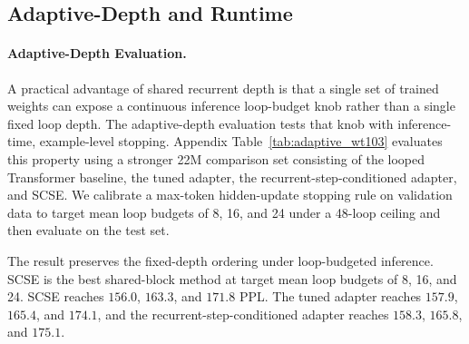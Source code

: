 \documentclass[letterpaper]{article} %
\newcommand{\SCSE}{\textsc{SCSE}}
\theoremstyle{remark}
\begin{document}
\subsection{Adaptive-Depth and Runtime}
\label{app:adaptive-runtime}
\paragraph{Adaptive-Depth Evaluation.} A practical advantage of shared recurrent depth is that a single set of trained weights can expose a continuous inference loop-budget knob rather than a single fixed loop depth.  The adaptive-depth evaluation tests that knob with inference-time, example-level stopping.  Appendix Table~\ref{tab:adaptive_wt103} evaluates this property using a stronger 22M comparison set consisting of the looped Transformer baseline, the tuned adapter, the recurrent-step-conditioned adapter, and \SCSE{}.  We calibrate a max-token hidden-update stopping rule on validation data to target mean loop budgets of 8, 16, and 24 under a 48-loop ceiling and then evaluate on the test set.

The result preserves the fixed-depth ordering under loop-budgeted inference.  \SCSE{} is the best shared-block method at target mean loop budgets of 8, 16, and 24.  \SCSE{} reaches $156.0$, $163.3$, and $171.8$ PPL.  The tuned adapter reaches $157.9$, $165.4$, and $174.1$, and the recurrent-step-conditioned adapter reaches $158.3$, $165.8$, and $175.1$.
\end{document}
